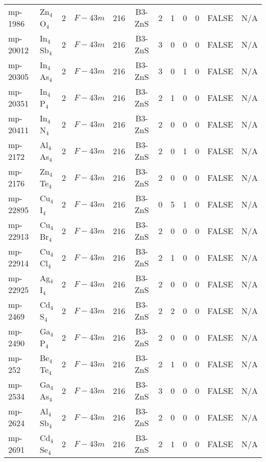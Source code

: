 {\begin{longtable}{llcccccccccc}
    mp-1986 & Zn$_{4}$O$_{4}$ & 2     & $F-43m$ & 216   & B3-ZnS & 2     & 1     & 0     & 0     & FALSE & N/A \\
    mp-20012 & In$_{4}$Sb$_{4}$ & 2     & $F-43m$ & 216   & B3-ZnS & 3     & 0     & 0     & 0     & FALSE & N/A \\
    mp-20305 & In$_{4}$As$_{4}$ & 2     & $F-43m$ & 216   & B3-ZnS & 3     & 0     & 1     & 0     & FALSE & N/A \\
    mp-20351 & In$_{4}$P$_{4}$ & 2     & $F-43m$ & 216   & B3-ZnS & 2     & 1     & 0     & 0     & FALSE & N/A \\
    mp-20411 & In$_{4}$N$_{4}$ & 2     & $F-43m$ & 216   & B3-ZnS & 2     & 0     & 0     & 0     & FALSE & N/A \\
    mp-2172 & Al$_{4}$As$_{4}$ & 2     & $F-43m$ & 216   & B3-ZnS & 2     & 0     & 1     & 0     & FALSE & N/A \\
    mp-2176 & Zn$_{4}$Te$_{4}$ & 2     & $F-43m$ & 216   & B3-ZnS & 2     & 0     & 0     & 0     & FALSE & N/A \\
    mp-22895 & Cu$_{4}$I$_{4}$ & 2     & $F-43m$ & 216   & B3-ZnS & 0     & 5     & 1     & 0     & FALSE & N/A \\
    mp-22913 & Cu$_{4}$Br$_{4}$ & 2     & $F-43m$ & 216   & B3-ZnS & 2     & 0     & 0     & 0     & FALSE & N/A \\
    mp-22914 & Cu$_{4}$Cl$_{4}$ & 2     & $F-43m$ & 216   & B3-ZnS & 2     & 1     & 0     & 0     & FALSE & N/A \\
    mp-22925 & Ag$_{4}$I$_{4}$ & 2     & $F-43m$ & 216   & B3-ZnS & 2     & 0     & 0     & 0     & FALSE & N/A \\
    mp-2469 & Cd$_{4}$S$_{4}$ & 2     & $F-43m$ & 216   & B3-ZnS & 2     & 2     & 0     & 0     & FALSE & N/A \\
    mp-2490 & Ga$_{4}$P$_{4}$ & 2     & $F-43m$ & 216   & B3-ZnS & 2     & 0     & 0     & 0     & FALSE & N/A \\
    mp-252 & Be$_{4}$Te$_{4}$ & 2     & $F-43m$ & 216   & B3-ZnS & 2     & 1     & 0     & 0     & FALSE & N/A \\
    mp-2534 & Ga$_{4}$As$_{4}$ & 2     & $F-43m$ & 216   & B3-ZnS & 3     & 0     & 0     & 0     & FALSE & N/A \\
    mp-2624 & Al$_{4}$Sb$_{4}$ & 2     & $F-43m$ & 216   & B3-ZnS & 2     & 0     & 0     & 0     & FALSE & N/A \\
    mp-2691 & Cd$_{4}$Se$_{4}$ & 2     & $F-43m$ & 216   & B3-ZnS & 2     & 1     & 0     & 0     & FALSE & N/A \\

\end{longtable}}
